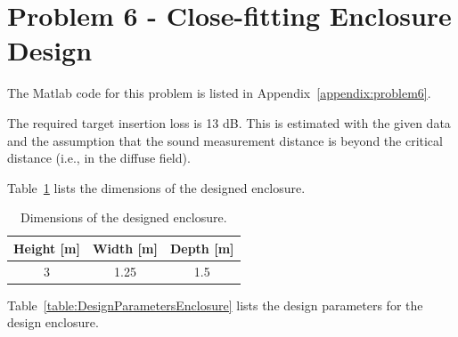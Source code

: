 {{\newpage
\section*{Problem 6 - Close-fitting Enclosure Design}

%


The Matlab code for this problem is listed in Appendix~\ref{appendix:problem6}.

\vspace{0.25cm}
The required target insertion loss is 13 dB.  This is estimated with the given data and the assumption that the sound measurement distance is beyond the critical distance (i.e., in the diffuse field).


\vspace{0.25cm}
Table~\ref{table:Q6enclosureDesign} lists the dimensions of the designed enclosure.

\vspace{0.25cm}
\setlength{\abovecaptionskip}{0pt}
\vspace{0.1cm}
{\renewcommand{\arraystretch}{1.25}
\begin{table}[h!]
    \begin{center}
        \small
        \begin{tabular}{ | c | c | c | }
            \hline
            \textbf{Height [m]}  &  \textbf{Width [m]}  &  \textbf{Depth [m]}  \\
            \hline
            3  &  1.25 &  1.5  \\
            \hline
        \end{tabular}
    \end{center}
    \caption{Dimensions of the designed enclosure.}
    \label{table:Q6enclosureDesign}
\end{table}


Table~\ref{table:DesignParametersEnclosure} lists the design parameters for the design enclosure.

}}}
